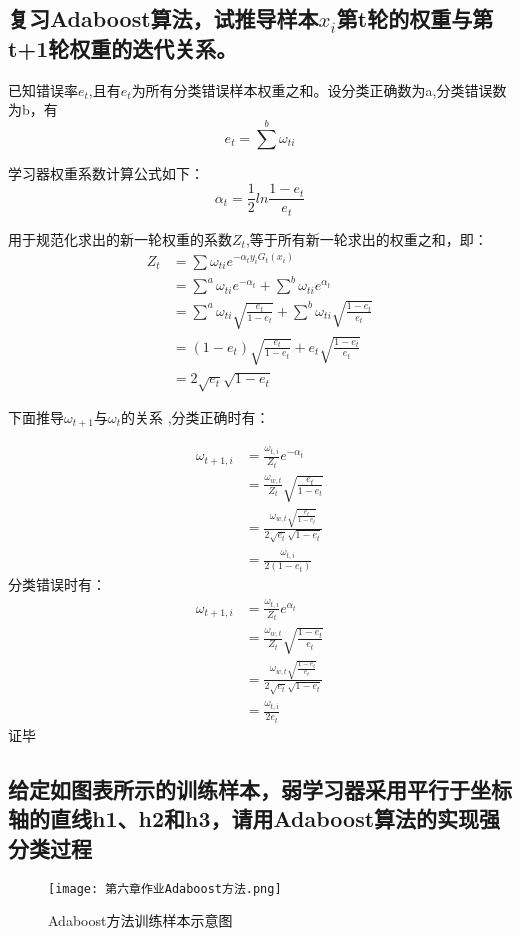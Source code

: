 \documentclass{ctexart}
\begin{document}
\subsection*{复习Adaboost算法，试推导样本$x_i$第t轮的权重与第t+1轮权重的迭代关系。}

已知错误率$e_t$,且有$e_t$为所有分类错误样本权重之和。设分类正确数为a,分类错误数为b，有
\begin{equation*}
e_t=\sum\limits^b\omega_{ti}
\end{equation*}

学习器权重系数计算公式如下：
\begin{equation*}
\alpha_t=\frac{1}{2}ln\frac{1-e_t}{e_t}
\end{equation*}

用于规范化求出的新一轮权重的系数$Z_t$,等于所有新一轮求出的权重之和，即：
\begin{align*}
Z_t&=\sum\omega_{ti}e^{-\alpha_ty_iG_t(x_i)}\\
&=\sum\limits^a\omega_{ti}e^{-\alpha_t}+\sum\limits^b\omega_{ti}e^{\alpha_t}\\
&=\sum\limits^a\omega_{ti}\sqrt{\frac{e_t}{1-e_t}}+\sum\limits^b\omega_{ti}\sqrt{\frac{1-e_t}{e_t}}\\
&=(1-e_t)\sqrt{\frac{e_t}{1-e_t}}+e_t\sqrt{\frac{1-e_t}{e_t}}\\
&=2\sqrt{e_t}\sqrt{1-e_t}
\end{align*}

下面推导$\omega_{t+1}$与$\omega_{t}$的关系
,分类正确时有：

\begin{align*}
\omega_{t+1,i}&=\frac{\omega_{t,i}}{Z_t}e^{-\alpha_t}\\
&=\frac{\omega_{w,t}}{Z_t}\sqrt{\frac{e_t}{1-e_t}}\\
&=\frac{\omega_{w,t}\sqrt{\frac{e_t}{1-e_t}}}{2\sqrt{e_t}\sqrt{1-e_t}}\\
&=\frac{\omega_{t,i}}{2(1-e_t)}
\end{align*}
分类错误时有：
\begin{align*}
\omega_{t+1,i}&=\frac{\omega_{t,i}}{Z_t}e^{\alpha_t}\\
&=\frac{\omega_{w,t}}{Z_t}\sqrt{\frac{1-e_t}{e_t}}\\
&=\frac{\omega_{w,t}\sqrt{\frac{1-e_t}{e_t}}}{2\sqrt{e_t}\sqrt{1-e_t}}\\
&=\frac{\omega_{t,i}}{2e_t}
\end{align*}
证毕
\subsection*{给定如图表所示的训练样本，弱学习器采用平行于坐标轴的直线h1、h2和h3，请用Adaboost算法的实现强分类过程}
\begin{figure}[H]
\texttt{[image: 第六章作业Adaboost方法.png]}
\caption{Adaboost方法训练样本示意图}
\end{figure}
\end{document}
